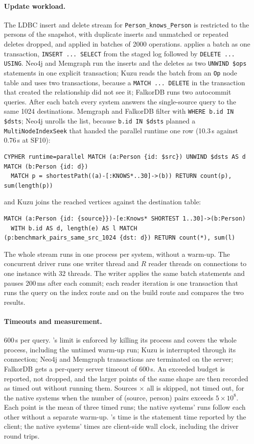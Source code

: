 \paragraph{Update workload.} The LDBC insert and delete stream for \texttt{Person\_knows\_Person} is restricted to the
persons of the snapshot, with duplicate inserts and unmatched or repeated deletes dropped, and applied in batches of
2000 operations. \duckdb applies a batch as one transaction, \texttt{INSERT ... SELECT} from the staged log followed by
\texttt{DELETE ... USING}. Neo4j and Memgraph run the inserts and the deletes as two \texttt{UNWIND \$ops} statements
in one explicit transaction; Kuzu reads the batch from an \texttt{Op} node table and uses two transactions, because a
\texttt{MATCH ... DELETE} in the transaction that created the relationship did not see it; FalkorDB runs two
autocommit queries. After each batch every system answers the single-source query to the same 1024 destinations.
Memgraph and FalkorDB filter with \texttt{WHERE b.id IN \$dsts}; Neo4j unrolls the list, because \texttt{b.id IN
\$dsts} planned a \texttt{MultiNodeIndexSeek} that handed the parallel runtime one row (10.3\,s against 0.76\,s at
SF10):
\begin{lstlisting}
CYPHER runtime=parallel MATCH (a:Person {id: $src}) UNWIND $dsts AS d MATCH (b:Person {id: d})
  MATCH p = shortestPath((a)-[:KNOWS*..30]->(b)) RETURN count(p), sum(length(p))
\end{lstlisting}
and Kuzu joins the reached vertices against the destination table:
\begin{lstlisting}
MATCH (a:Person {id: {source}})-[e:Knows* SHORTEST 1..30]->(b:Person)
  WITH b.id AS d, length(e) AS l MATCH (p:benchmark_pairs_same_src_1024 {dst: d}) RETURN count(*), sum(l)
\end{lstlisting}
The whole stream runs in one process per system, without a warm-up. The concurrent driver runs one writer thread and
$R$ reader threads on connections to one \duckdb instance with 32 threads. The writer applies the same batch
statements and pauses 200\,ms after each commit; each reader iteration is one transaction that runs the query on the
index route and on the build route and compares the two results.

\paragraph{Timeouts and measurement.} 600\,s per query. \duckpgq's limit is enforced by killing its process and covers
the whole process, including the untimed warm-up run; Kuzu is interrupted through its connection; Neo4j and Memgraph
transactions are terminated on the server; FalkorDB gets a per-query server timeout of 600\,s. An exceeded budget is
reported, not dropped, and the larger points of the same shape are then recorded as timed out without running them.
Sources $\times$ all is skipped, not timed out, for the native systems when the number of (source, person) pairs
exceeds $5 \times 10^8$. Each point is the mean of three timed runs; the native systems' runs follow each other
without a separate warm-up. \duckpgq's time is the statement time reported by the \duckdb client; the native systems'
times are client-side wall clock, including the driver round trips.
